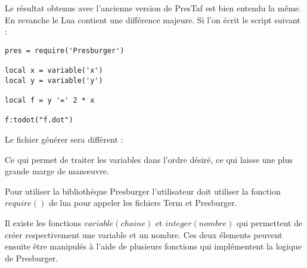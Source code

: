 Le résultat obtenus avec l'ancienne version de PresTaf est bien entendu la même. En revanche le Lua contient une différence majeure. Si l'on écrit le script suivant :

\begin{lstlisting}[mathescape=true, frame=single]
pres = require('Presburger')

local x = variable('x')
local y = variable('y')

local f = y '=' 2 * x 

f:todot("f.dot")
\end{lstlisting}

Le fichier générer sera différent : \vspace{0.5cm}


Ce qui permet de traiter les variables dans l'ordre désiré, ce qui laisse une plus grande marge de man\oe{}uvre.\\\par

Pour utiliser la bibliothèque Presburger l'utilisateur doit utiliser la fonction $require()$ de lua pour appeler les fichiers Term et Presburger.\\\par

Il existe les fonctions $variable(chaine)$ et $integer(nombre)$ qui permettent de créer respectivement une variable et un nombre. Ces deux élements peuvent ensuite être manipulés à l'aide de plusieurs fonctions qui implémentent la logique de Presburger.\\\par

